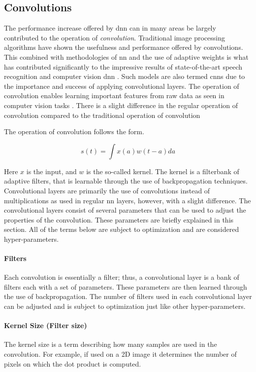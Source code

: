 \subsection{Convolutions}\label{sec:convolutions}
The performance increase offered by \gls{dnn} can in many areas be largely contributed to the operation of \emph{convolution}. Traditional image processing algorithms have shown the usefulness and performance offered by convolutions. This combined with methodologies of \gls{nn} and the use of adaptive weights is what has contributed significantly to the impressive results of state-of-the-art speech recognition and computer vision \gls{dnn} \cite{Goodfellow-et-al-2016}. Such models are also termed \glspl{cnn} due to the importance and success of applying convolutional layers. The operation of convolution enables learning important features from raw data as seen in computer vision tasks \cite{LeCun2015}. There is a slight difference in the regular operation of convolution compared to the traditional operation of convolution

The operation of convolution follows the form.

\begin{equation}\label{eq:convolution}
  s(t) = \int x(a)w(t-a)da
\end{equation}

Here $x$ is the input, and $w$ is the so-called kernel. The kernel is a filterbank of adaptive filters, that is learnable through the use of backpropagation techniques. Convolutional layers are primarily the use of convolutions instead of multiplications as used in regular \gls{nn} layers, however, with a slight difference. The convolutional layers consist of several parameters that can be used to adjust the properties of the convolution. These parameters are briefly explained in this section. All of the terms below are subject to optimization and are considered hyper-parameters.

\paragraph{Filters}
Each convolution is essentially a filter; thus, a convolutional layer is a bank of filters each with a set of parameters. These parameters are then learned through the use of backpropagation. The number of filters used in each convolutional layer can be adjusted and is subject to optimization just like other hyper-parameters. 

\paragraph{Kernel Size (Filter size)}
The kernel size is a term describing how many samples are used in the convolution. For example, if used on a 2D image it determines the number of pixels on which the dot product is computed. 


